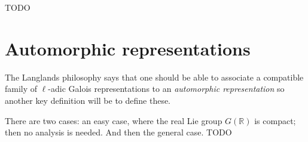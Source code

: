 \documentclass{amsart}
\newcommand{\R}{\mathbb{R}}
\begin{document}
TODO

\section{Automorphic representations}

The Langlands philosophy says that one should be able to associate a compatible family of $\ell$-adic Galois representations to an \emph{automorphic representation} so another key definition will be to define these.

There are two cases: an easy case, where the real Lie group $G(\R)$ is compact; then no analysis is needed. And then the general case. TODO
\end{document}
